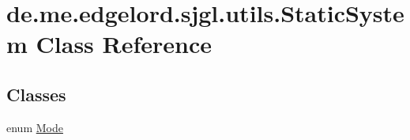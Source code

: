 \hypertarget{classde_1_1me_1_1edgelord_1_1sjgl_1_1utils_1_1_static_system}{}\section{de.\+me.\+edgelord.\+sjgl.\+utils.\+Static\+System Class Reference}
\label{classde_1_1me_1_1edgelord_1_1sjgl_1_1utils_1_1_static_system}
\subsection*{Classes}
\begin{DoxyCompactItemize}
\item 
enum \mbox{\hyperlink{enumde_1_1me_1_1edgelord_1_1sjgl_1_1utils_1_1_static_system_1_1_mode}{Mode}}
\end{DoxyCompactItemize}
